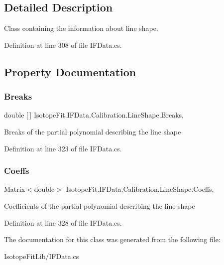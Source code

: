 \subsection{Detailed Description}
Class containing the information about line shape. 



Definition at line 308 of file I\+F\+Data.\+cs.



\subsection{Property Documentation}
\mbox{\label{class_isotope_fit_1_1_i_f_data_1_1_calibration_1_1_line_shape_a447511120da7a7c67677aeb723cffd77}} 
\subsubsection{\texorpdfstring{Breaks}{Breaks}}
{\footnotesize\ttfamily double \mbox{[}$\,$\mbox{]} Isotope\+Fit.\+I\+F\+Data.\+Calibration.\+Line\+Shape.\+Breaks\hspace{0.3cm}{\ttfamily [get]}, {\ttfamily [set]}}



Breaks of the partial polynomial describing the line shape 



Definition at line 323 of file I\+F\+Data.\+cs.

\mbox{\label{class_isotope_fit_1_1_i_f_data_1_1_calibration_1_1_line_shape_a8892e37963113bc557f3324a10ff82a0}} 
\subsubsection{\texorpdfstring{Coeffs}{Coeffs}}
{\footnotesize\ttfamily Matrix$<$double$>$ Isotope\+Fit.\+I\+F\+Data.\+Calibration.\+Line\+Shape.\+Coeffs\hspace{0.3cm}{\ttfamily [get]}, {\ttfamily [set]}}



Coefficients of the partial polynomial describing the line shape 



Definition at line 328 of file I\+F\+Data.\+cs.



The documentation for this class was generated from the following file\+:\begin{DoxyCompactItemize}
\item 
Isotope\+Fit\+Lib/I\+F\+Data.\+cs\end{DoxyCompactItemize}
